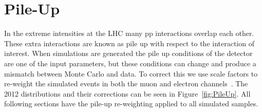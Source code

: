 

\section{Pile-Up}


In the extreme intensities at the LHC many pp interactions overlap each other.  These extra interactions are known as pile up with respect to the interaction of interest. When simulations are generated the pile up conditions of the detector are one of the input parameters, but these conditions can change and produce a mismatch between Monte Carlo and data.  To correct this we use scale factors to re-weight the simulated events in both the muon and electron channels~\cite{cms_lumi_plots}.  The 2012 distributions and their corrections can be seen in Figure~\ref{fig:PileUp}. All following sections have the pile-up re-weighting applied to all simulated samples.  


